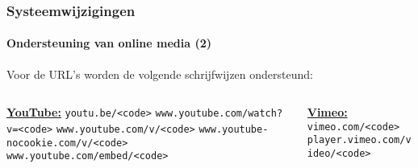 \begin{frame}[fragile]
	\frametitle{Systeemwijzigingen}
	\framesubtitle{Ondersteuning van online media (2)}

	Voor de URL's worden de volgende schrijfwijzen ondersteund:
	\vspace{0.4cm}

	\begin{columns}[T]
		\begin{column}{.52\textwidth}
			\smaller
				\tabto{0.2cm}\textbf{\underline{YouTube:}}\newline
				\tabto{0.2cm}\texttt{youtu.be/<code>}\newline
				\tabto{0.2cm}\texttt{www.youtube.com/watch?v=<code>}\newline
				\tabto{0.2cm}\texttt{www.youtube.com/v/<code>}\newline
				\tabto{0.2cm}\texttt{www.youtube-nocookie.com/v/<code>}\newline
				\tabto{0.2cm}\texttt{www.youtube.com/embed/<code>}\newline
		\end{column}
		\begin{column}{.48\textwidth}
			\vspace{-0.25cm}\smaller
				\textbf{\underline{Vimeo:}}\newline
				\texttt{vimeo.com/<code>}\newline
				\texttt{player.vimeo.com/video/<code>}\newline
		\end{column}
	\end{columns}

\end{frame}


